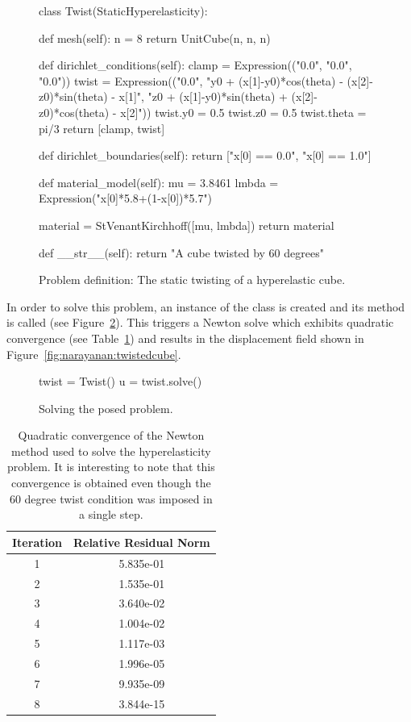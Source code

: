 \begin{figure}
\begin{python}
class Twist(StaticHyperelasticity):

    def mesh(self):
        n = 8
        return UnitCube(n, n, n)

    def dirichlet_conditions(self):
        clamp = Expression(("0.0", "0.0", "0.0"))
        twist = Expression(("0.0",
        "y0 + (x[1]-y0)*cos(theta) - (x[2]-z0)*sin(theta) - x[1]",
        "z0 + (x[1]-y0)*sin(theta) + (x[2]-z0)*cos(theta) - x[2]"))
        twist.y0 = 0.5
        twist.z0 = 0.5
        twist.theta = pi/3
        return [clamp, twist]

    def dirichlet_boundaries(self):
        return ["x[0] == 0.0", "x[0] == 1.0"]

    def material_model(self):
        mu    = 3.8461
        lmbda = Expression("x[0]*5.8+(1-x[0])*5.7")

        material = StVenantKirchhoff([mu, lmbda])
        return material

    def __str__(self):
        return "A cube twisted by 60 degrees"
\end{python}
\caption{Problem definition: The static twisting of a hyperelastic
  cube.}
\label{code:narayanan:statictwist}
\end{figure}

In order to solve this problem, an instance of the  class
is created and its  method is called (see
Figure~\ref{code:narayanan:solveproblem}). This triggers a Newton
solve which exhibits quadratic convergence (see
Table~\ref{tab:narayanan:residualnorms}) and results in the
displacement field shown in
Figure~\ref{fig:narayanan:twistedcube}.

\begin{figure}
\begin{python}
twist = Twist()
u = twist.solve()
\end{python}
\caption{Solving the posed problem.}
\label{code:narayanan:solveproblem}
\end{figure}

\begin{table}
  \centering
  \begin{tabular}{|c|c|}
    \hline Iteration & Relative Residual Norm \\
    \hline
    1 & 5.835e-01\\
    2 & 1.535e-01\\
    3 & 3.640e-02\\
    4 & 1.004e-02\\
    5 & 1.117e-03\\
    6 & 1.996e-05\\
    7 & 9.935e-09\\
    8 & 3.844e-15\\
    \hline
  \end{tabular}
  \caption{Quadratic convergence of the Newton method used to solve
    the hyperelasticity problem. It is interesting to note that this
    convergence is obtained even though the 60 degree twist condition
    was imposed in a single step.}
  \label{tab:narayanan:residualnorms}
\end{table}

